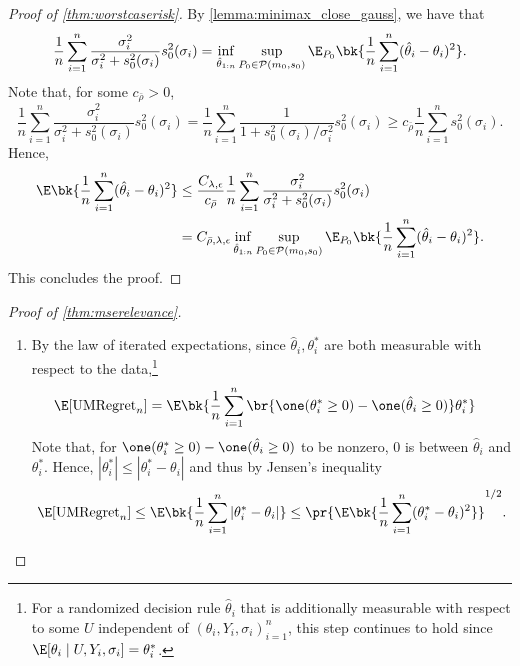 \documentclass[12pt, reqno]{amsart}
\newif\ifrepeatthm
\newcommand{\utilmaxreg}{\mathrm{UMRegret}_n}
\numberwithin{equation}{section}
\begin{document}
\begin{appendices}
\begin{proof}[Proof of \cref{thm:worstcaserisk}]
By \cref{lemma:minimax_close_gauss}, we have that  \[
\frac{1}{n} \sum_{i=1}^n \frac{\sigma_i^2}{\sigma_i^2 + s_0^2(\sigma_i)} s_0^2(\sigma_i)
=  \inf_{\hat\theta_{1:n}} \sup_{P_0 \in \mathcal P(m_0, s_0)} \E_{P_0} \bk{\frac{1}{n}
\sum_{i=1}^n (\hat\theta_i - \theta_i)^2}.
\]
Note that, for some $c_{\bar\rho} > 0$, \[
\frac{1}{n} \sum_{i=1}^n \frac{\sigma_i^2}{\sigma_i^2 + s_0^2(\sigma_i)} s_0^2(\sigma_i)
 = \frac{1}{n} \sum_{i=1}^n \frac{1}{1 + s_0^2(\sigma_i)/\sigma_i^2} s_0^2
 (\sigma_i) \ge c_{\bar\rho} \frac{1}{n} \sum_{i=1}^n s_0^2(\sigma_i).
\]
Hence, \begin{align*}
\E\bk{\frac{1}{n}\sum_{i=1}^n (\hat\theta_i - \theta_i)^2} &\le \frac{C_{\lambda, \epsilon}}{c_
 {\bar\rho}} \frac{1}{n} \sum_{i=1}^n \frac{\sigma_i^2}{\sigma_i^2 + s_0^2
 (\sigma_i)} s_0^2(\sigma_i)  \\ &= C_{\bar\rho, \lambda, \epsilon} \inf_{\hat\theta_{1:n}} \sup_
 {P_0 \in
\mathcal P (m_0, s_0)} \E_{P_0} \bk{\frac{1}{n}
\sum_{i=1}^n (\hat\theta_i - \theta_i)^2}.
\end{align*}
This concludes the proof.
\end{proof}





\ifrepeatthm
  \mserelevance*
\fi 

\begin{proof}[Proof of \cref{thm:mserelevance}]

\begin{enumerate}[wide]
  \item 
By the law of iterated expectations, since $\hat\theta_i, \theta_i^*$ are both measurable
with respect to the data,\footnote{For a randomized decision rule $\hat\theta_i$ that is
additionally measurable with respect to some $U$ independent of $ (\theta_i, Y_i,
\sigma_i)_{i=1}^n$, this step continues to hold since $\E[\theta_i \mid U, Y_i, \sigma_i]
= \theta_i^*$.}
  \begin{align*}
\E[\utilmaxreg] &= \E \bk{\frac{1}{n} \sum_{i=1}^n \br{\one(\theta_i^* \ge 0) - \one
(\hat\theta_i \ge 0)} \theta_i^*}
  \end{align*}
  Note that, for $\one(\theta_i^* \ge 0) - \one
(\hat\theta_i \ge
0)$ to be nonzero, $0$ is between $\hat\theta_i$ and $\theta_i^*$. Hence,
$|\theta_i^*| \le |\theta_i^* - \theta_i|$ and thus by Jensen's inequality \[
\E[\utilmaxreg] \le \E\bk{\frac{1}{n} \sum_{i=1}^n |\theta_i^* - \theta_i|  } \le \pr{\E
\bk{
\frac{1}{n} \sum_{i=1}^n (\theta_i^* - \theta_i)^2  }}^{1/2}.
\]



\end{enumerate}
\end{proof}
\end{appendices}
\end{document}
